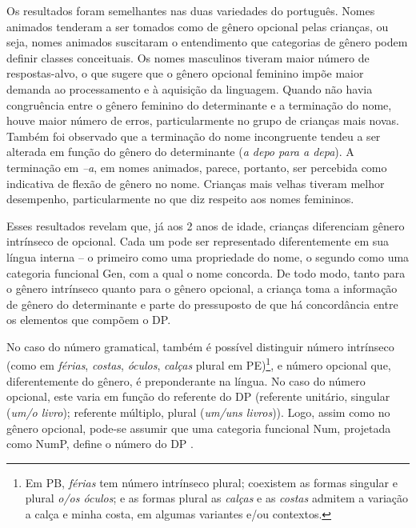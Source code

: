 \documentclass[output=paper]{LSP/langsci}
\begin{document}
Os resultados foram semelhantes nas duas variedades do português. Nomes animados tenderam a ser tomados como de gênero opcional pelas crianças, ou seja, nomes animados suscitaram o entendimento que categorias de gênero podem definir classes conceituais. Os nomes masculinos tiveram maior número de respostas-alvo, o que sugere que o gênero opcional feminino impõe maior demanda ao processamento e à aquisição da linguagem. Quando não havia congruência entre o gênero feminino do determinante e a terminação do nome, houve maior número de erros, particularmente no grupo de crianças mais novas. Também foi observado que a terminação do nome incongruente tendeu a ser alterada em função do gênero do determinante (\textit{a depo para a depa}). A terminação em \textit{–a}, em nomes animados, parece, portanto, ser percebida como indicativa de flexão de gênero no nome. Crianças mais velhas tiveram melhor desempenho, particularmente no que diz respeito aos nomes femininos. 


Esses resultados revelam que, já aos 2 anos de idade, crianças diferenciam gênero intrínseco de opcional. Cada um pode ser representado diferentemente em sua língua interna – o primeiro como uma propriedade do nome, o segundo como uma categoria funcional Gen, com a qual o nome concorda. De todo modo, tanto para o gênero intrínseco quanto para o gênero opcional, a criança toma a informação de gênero do determinante e parte do pressuposto de que há concordância entre os elementos que compõem o DP.

No caso do número gramatical, também é possível distinguir número intrínseco (como em \textit{férias}, \textit{costas}, \textit{óculos}, \textit{calças} plural em PE)\footnote{Em PB, \textit{férias} tem número intrínseco plural; coexistem as formas singular e plural \textit{o/os óculos}; e as formas plural as \textit{calças} e as \textit{costas} admitem a variação a calça e minha costa, em algumas variantes e/ou contextos.}, e número opcional que, diferentemente do gênero, é preponderante na língua. No caso do número opcional, este varia em função do referente do DP (referente unitário, singular (\textit{um/o livro}); referente múltiplo, plural (\textit{um/uns livros})). Logo, assim como no gênero opcional, pode-se assumir que uma categoria funcional Num, projetada como NumP, define o número do DP \citep{ritter1991,augusto_etal2006}. 
\end{document}
